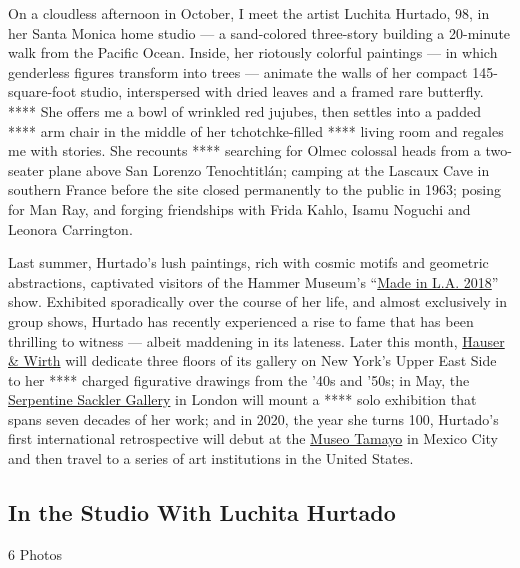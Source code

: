 On a cloudless afternoon in October, I meet the artist Luchita Hurtado,
98, in her Santa Monica home studio --- a sand-colored three-story
building a 20-minute walk from the Pacific Ocean. Inside, her riotously
colorful paintings --- in which genderless figures transform into trees
--- animate the walls of her compact 145-square-foot studio,
interspersed with dried leaves and a framed rare butterfly. **** She
offers me a bowl of wrinkled red jujubes, then settles into a padded
**** arm chair in the middle of her tchotchke-filled **** living room
and regales me with stories. She recounts **** searching for Olmec
colossal heads from a two-seater plane above San Lorenzo Tenochtitlán;
camping at the Lascaux Cave in southern France before the site closed
permanently to the public in 1963; posing for Man Ray, and forging
friendships with Frida Kahlo, Isamu Noguchi and Leonora Carrington.

Last summer, Hurtado's lush paintings, rich with cosmic motifs and
geometric abstractions, captivated visitors of the Hammer Museum's
``\href{https://hammer.ucla.edu/exhibitions/2018/made-in-la-2018/}{Made
in L.A. 2018}'' show. Exhibited sporadically over the course of her
life, and almost exclusively in group shows, Hurtado has recently
experienced a rise to fame that has been thrilling to witness --- albeit
maddening in its lateness. Later this month,
\href{https://www.hauserwirth.com/hauser-wirth-exhibitions/23119-luchita-hurtado-dark-years}{Hauser
\& Wirth} will dedicate three floors of its gallery on New York's Upper
East Side to her **** charged figurative drawings from the '40s and
'50s; in May, the \href{https://www.serpentinegalleries.org/}{Serpentine
Sackler Gallery} in London will mount a **** solo exhibition that spans
seven decades of her work; and in 2020, the year she turns 100,
Hurtado's first international retrospective will debut at the
\href{http://museotamayo.org/}{Museo Tamayo} in Mexico City and then
travel to a series of art institutions in the United States.

\href{https://www.nytimes3xbfgragh.onion/slideshow/2019/01/29/t-magazine/in-the-studio-with-luchita-hurtado.html}{}

\hypertarget{in-the-studio-with-luchita-hurtado}{%
\subsection{In the Studio With Luchita
Hurtado}\label{in-the-studio-with-luchita-hurtado}}

6 Photos

